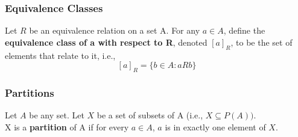 \documentclass{article}
\begin{document}
\subsubsection{Equivalence Classes}
Let $R$ be an equivalence relation on a set A. For any $a \in A$, define the \textbf{equivalence class of a with respect to R}, denoted $[a]_R$, to be the set of elements that relate to it, i.e.,
$$[a]_R = \{b \in A: aRb \}$$

\subsubsection{Partitions}
Let $A$ be any set. Let $X$ be a set of subsets of A (i.e., $X \subseteq P(A))$.\\
X is a \textbf{partition} of A if for every $a \in A$, $a$ is in exactly one element of $X$.
\end{document}
